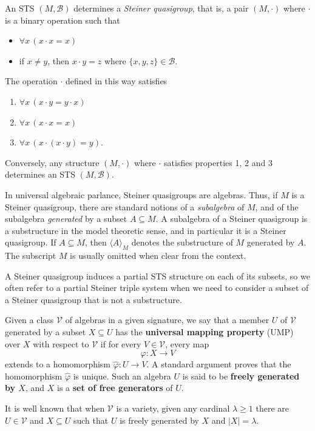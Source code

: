 \documentclass[10pt,a4paper]{article}
\theoremstyle{note}
\begin{document}
An STS $(M, \mathcal{B})$ determines a \textit{Steiner quasigroup}, that is, a pair $(M, \cdot)$ where $\cdot$ is a binary operation such that
\begin{itemize}
\item $\forall x \, (x\cdot x =x)$
\item if $x \neq y$, then $x \cdot y = z$ where $\{x,y,z \} \in \mathcal{B}$.
\end{itemize}
The operation $\cdot$ defined in this way satisfies
 \begin{enumerate}
\item $\forall x \, (x \cdot y= y\cdot x)$
\item $\forall x \, (x\cdot x =x)$
\item $\forall x \, (x\cdot (x\cdot y)=y)$.
\end{enumerate}
Conversely, any structure $(M, \cdot)$ where $\cdot$ satisfies properties 1, 2 and 3 determines an STS $(M, \mathcal{B})$.

In universal algebraic parlance, Steiner quasigroups are algebras. Thus, if $M$ is a Steiner quasigroup, there are standard notions of a \textit{subalgebra} of $M$, and of the subalgebra \textit{generated} by a subset $A \subseteq M$. A subalgebra of a Steiner quasigroup is a substructure in the model theoretic sense, and in particular it is a Steiner quasigroup. If $A \subseteq M$, then $\langle A \rangle_M$ denotes the substructure of $M$ generated by $A$. The subscript $M$ is usually omitted when clear  from the context.

A Steiner quasigroup induces a partial STS structure on each of its subsets, so we often refer to a partial Steiner triple system when we need to consider a subset of a Steiner quasigroup that is not a substructure.

Given a class  $\mathcal{V}$ of algebras in a given signature, we say that a member $U$ of $\mathcal{V}$ generated by a subset $X \subseteq U$ has the  \textbf{universal mapping property} (UMP) over $X$ with respect to $\mathcal{V}$ if for every $V \in \mathcal{V}$, every map
 \[ \varphi : X \to V \]
extends to a homomorphism $ \hat{\varphi} : U \to V $. A standard argument proves that the homomorphism $\hat{\varphi}$ is unique. Such an algebra $U$ is said to be \textbf{freely generated by $X$}, and $X$ is a \textbf{set of free generators} of $U$. 

It is well known that when $\mathcal{V}$ is a variety, given any cardinal $\lambda \geq 1$ there are $U \in \mathcal{V}$ and $X \subseteq U$ such that $U$ is freely generated by $X $ and $|X|= \lambda$.
\end{document}
